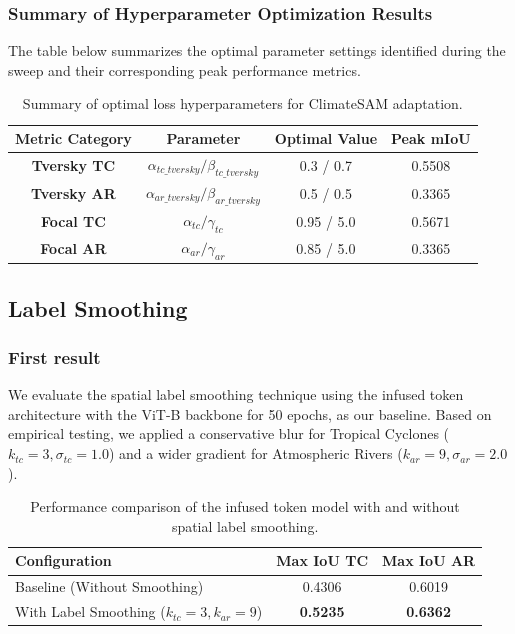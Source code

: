 \subsubsection{Summary of Hyperparameter Optimization Results}

The table below summarizes the optimal parameter settings identified during the sweep and their corresponding peak performance metrics.

\begin{table}[h]
\centering
\begin{tabular}{@{}cccc@{}}
\toprule
Metric Category & Parameter & Optimal Value & Peak mIoU \\ \midrule
\textbf{Tversky TC} & $\alpha_{tc\_tversky} / \beta_{tc\_tversky}$ & 0.3 / 0.7 & 0.5508 \\
\textbf{Tversky AR} & $\alpha_{ar\_tversky} / \beta_{ar\_tversky}$ & 0.5 / 0.5 & 0.3365 \\
\textbf{Focal TC} & $\alpha_{tc} / \gamma_{tc}$ & 0.95 / 5.0 & 0.5671 \\
\textbf{Focal AR} & $\alpha_{ar} / \gamma_{ar}$ & 0.85 / 5.0 & 0.3365 \\ \bottomrule
\end{tabular}
\caption{Summary of optimal loss hyperparameters for ClimateSAM adaptation.}
\end{table}

\subsection{Label Smoothing}

\subsubsection{First result}

We evaluate the spatial label smoothing technique using the infused token architecture with the ViT-B backbone for 50 epochs, as our baseline. Based on empirical testing, we applied a conservative blur for Tropical Cyclones ($k_{tc}=3, \sigma_{tc}=1.0$) and a wider gradient for Atmospheric Rivers ($k_{ar}=9, \sigma_{ar}=2.0$). 


\begin{table}[h]
\centering
\begin{tabular}{lcc}
\textbf{Configuration} & Max IoU TC & Max IoU AR \\
\hline
Baseline (Without Smoothing) & 0.4306 & 0.6019 \\ 
With Label Smoothing ($k_{tc}=3, k_{ar}=9$) & \textbf{0.5235} & \textbf{0.6362} \\ 
\hline
\end{tabular}
\caption{Performance comparison of the infused token model with and without spatial label smoothing.}
\label{tab:smooth_performance}
\end{table}


